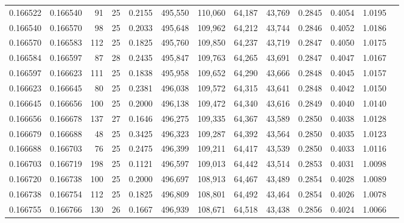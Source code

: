 \begin{tabular}{rrrrrrrrrrrrr}
0.166522 & 0.166540 &  91 &  25 &                                     0.2155 & 495,550 & 110,060 &  64,187 &  43,769 & 0.2845 & 0.4054 & 1.0195 \\
0.166540 & 0.166570 &  98 &  25 &                                     0.2033 & 495,648 & 109,962 &  64,212 &  43,744 & 0.2846 & 0.4052 & 1.0186 \\
0.166570 & 0.166583 & 112 &  25 &                                     0.1825 & 495,760 & 109,850 &  64,237 &  43,719 & 0.2847 & 0.4050 & 1.0175 \\
0.166584 & 0.166597 &  87 &  28 &                                     0.2435 & 495,847 & 109,763 &  64,265 &  43,691 & 0.2847 & 0.4047 & 1.0167 \\
0.166597 & 0.166623 & 111 &  25 &                                     0.1838 & 495,958 & 109,652 &  64,290 &  43,666 & 0.2848 & 0.4045 & 1.0157 \\
0.166623 & 0.166645 &  80 &  25 &                                     0.2381 & 496,038 & 109,572 &  64,315 &  43,641 & 0.2848 & 0.4042 & 1.0150 \\
0.166645 & 0.166656 & 100 &  25 &                                     0.2000 & 496,138 & 109,472 &  64,340 &  43,616 & 0.2849 & 0.4040 & 1.0140 \\
0.166656 & 0.166678 & 137 &  27 &                                     0.1646 & 496,275 & 109,335 &  64,367 &  43,589 & 0.2850 & 0.4038 & 1.0128 \\
0.166679 & 0.166688 &  48 &  25 &                                     0.3425 & 496,323 & 109,287 &  64,392 &  43,564 & 0.2850 & 0.4035 & 1.0123 \\
0.166688 & 0.166703 &  76 &  25 &                                     0.2475 & 496,399 & 109,211 &  64,417 &  43,539 & 0.2850 & 0.4033 & 1.0116 \\
0.166703 & 0.166719 & 198 &  25 &                                     0.1121 & 496,597 & 109,013 &  64,442 &  43,514 & 0.2853 & 0.4031 & 1.0098 \\
0.166720 & 0.166738 & 100 &  25 &                                     0.2000 & 496,697 & 108,913 &  64,467 &  43,489 & 0.2854 & 0.4028 & 1.0089 \\
0.166738 & 0.166754 & 112 &  25 &                                     0.1825 & 496,809 & 108,801 &  64,492 &  43,464 & 0.2854 & 0.4026 & 1.0078 \\
0.166755 & 0.166766 & 130 &  26 &                                     0.1667 & 496,939 & 108,671 &  64,518 &  43,438 & 0.2856 & 0.4024 & 1.0066 \\

\end{tabular}
